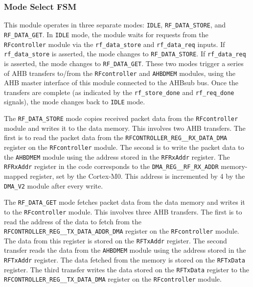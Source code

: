 \subsubsection{Mode Select FSM}
This module operates in three separate modes: \texttt{IDLE}, \texttt{RF\_DATA\_STORE}, and \texttt{RF\_DATA\-\_GET}. In \texttt{IDLE} mode, the module waits for requests from the \texttt{RFcontroller} module via the \texttt{rf\_data\_store} and \texttt{rf\_data\_req} inputs. If \texttt{rf\_data\_store} is asserted, the mode changes to \texttt{RF\_DATA\_STORE}. If \texttt{rf\_data\_req} is asserted, the mode changes to \texttt{RF\_DATA\_GET}. These two modes trigger a series of AHB transfers to/from the \texttt{RFcontroller} and \texttt{AHBDMEM} modules, using the AHB master interface of this module connected to the AHBsub bus. Once the transfers are complete (as indicated by the \texttt{rf\_store\_done} and \texttt{rf\_req\_done} signals), the mode changes back to \texttt{IDLE} mode.

The \texttt{RF\_DATA\_STORE} mode copies received packet data from the \texttt{RFcontroller} module and writes it to the data memory. This involves two AHB transfers. The first is to read the packet data from the \texttt{RFCONTROLLER\_REG\_\_RX\_DATA\_DMA} register on the \texttt{RFcontroller} module. The second is to write the packet data to the \texttt{AHBDMEM} module using the address stored in the \texttt{RFRxAddr} register. The \texttt{RFRxAddr} register in the code corresponds to the \texttt{DMA\_REG\_\_RF\_RX\_ADDR} memory-mapped register, set by the Cortex-M0. This address is incremented by 4 by the \texttt{DMA\_V2} module after every write.

The \texttt{RF\_DATA\_GET} mode fetches packet data from the data memory and writes it to the \texttt{RFcontroller} module. This involves three AHB transfers. The first is to read the address of the data to fetch from the \texttt{RFCONTROLLER\_REG\_\_TX\_DATA\_ADDR\_DMA} register on the \texttt{RFcontroller} module. The data from this register is stored on the \texttt{RFTxAddr} register. The second transfer reads the data from the \texttt{AHBDMEM} module using the address stored in the \texttt{RFTxAddr} register. The data fetched from the memory is stored on the \texttt{RFTxData} register. The third transfer writes the data stored on the \texttt{RFTxData} register to the \texttt{RFCONTROLLER\_REG\_\_TX\_DATA\_DMA} register on the \texttt{RFcontroller} module.


